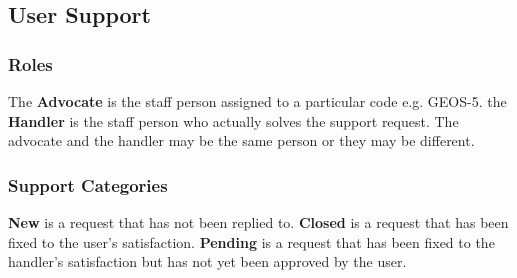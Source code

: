 \subsection{User Support}
\label{sec:usr_support}


\subsubsection{Roles}
The {\bf Advocate} is the staff person assigned to a particular code e.g. GEOS-5.
the {\bf Handler} is the staff person who actually solves the support request. The advocate and the handler may be the same person or they may be different.

\subsubsection{Support Categories}
{\bf New} is a request that has not been replied to.
{\bf Closed} is a request that has been fixed to the user's satisfaction.
{\bf Pending} is a request that has been fixed to the handler's satisfaction but has not yet been approved by the user.


